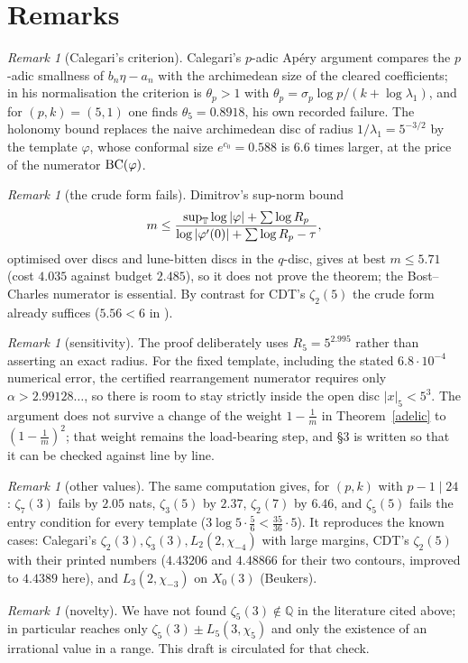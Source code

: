 \documentclass[11pt]{amsart}
\theoremstyle{remark}
\newtheorem{remark}[theorem]{Remark}
\newcommand{\Q}{\mathbb Q}\newcommand{\Z}{\mathbb Z}\newcommand{\R}{\mathbb R}\newcommand{\C}{\mathbb C}
\begin{document}
\section{Remarks}
\begin{remark}[Calegari's criterion]
Calegari's $p$-adic Ap\'ery argument \cite{Cal05} compares the $p$-adic smallness of $b_n\eta-a_n$ with the archimedean size of the cleared coefficients; in his normalisation the criterion is $\theta_p>1$ with $\theta_p=\sigma_p\log p/(k+\log\lambda_1)$, and for $(p,k)=(5,1)$ one finds $\theta_5=0.8918$, his own recorded failure. The holonomy bound replaces the naive archimedean disc of radius $1/\lambda_1=5^{-3/2}$ by the template $\varphi$, whose conformal size $e^{c_0}=0.588$ is $6.6$ times larger, at the price of the numerator $\mathrm{BC}(\varphi)$.
\end{remark}
\begin{remark}[the crude form fails]\label{crude}
Dimitrov's sup-norm bound
\[
m\le\frac{\sup_\mathbb T\log|\varphi|+\sum\log R_p}
{\log|\varphi'(0)|+\sum\log R_p-\tau},
\]
optimised over discs and lune-bitten discs in the $q$-disc, gives at best $m\le5.71$ (cost $4.035$ against budget $2.485$), so it does not prove the theorem; the Bost--Charles numerator is essential. By contrast for CDT's $\zeta_2(5)$ the crude form already suffices ($5.56<6$ in \cite{DimLNT}).
\end{remark}
\begin{remark}[sensitivity]
The proof deliberately uses $R_5=5^{2.995}$ rather than asserting an exact radius. For the fixed template, including the stated $6.8\cdot10^{-4}$ numerical error, the certified rearrangement numerator requires only $\alpha>2.99128\ldots$, so there is room to stay strictly inside the open disc $|x|_5<5^3$. The argument does not survive a change of the weight $1-\tfrac1m$ in Theorem~\ref{adelic} to $(1-\tfrac1m)^2$; that weight remains the load-bearing step, and \S3 is written so that it can be checked against \cite[\S6.3]{CDTl2chi} line by line.
\end{remark}
\begin{remark}[other values]
The same computation gives, for $(p,k)$ with $p-1\mid24$: $\zeta_7(3)$ fails by $2.05$ nats, $\zeta_3(5)$ by $2.37$, $\zeta_2(7)$ by $6.46$, and $\zeta_5(5)$ fails the entry condition for every template ($3\log5\cdot\tfrac56<\tfrac{35}{36}\cdot5$). It reproduces the known cases: Calegari's $\zeta_2(3),\zeta_3(3),L_2(2,\chi_{-4})$ with large margins, CDT's $\zeta_2(5)$ with their printed numbers ($4.43206$ and $4.48866$ for their two contours, improved to $4.4389$ here), and $L_3(2,\chi_{-3})$ on $X_0(3)$ (Beukers).
\end{remark}
\begin{remark}[novelty]
We have not found $\zeta_5(3)\notin\Q$ in the literature cited above; in particular \cite{Beu08} reaches only $\zeta_5(3)\pm L_5(3,\chi_5)$ and \cite{LLS25} only the existence of an irrational value in a range. This draft is circulated for that check.
\end{remark}
\end{document}
